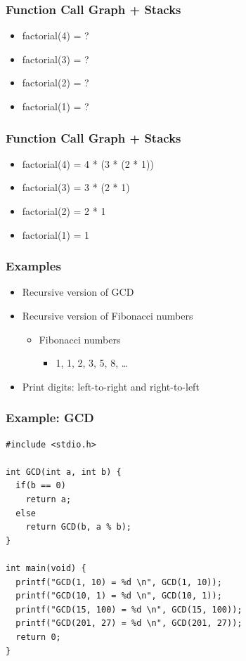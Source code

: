 \documentclass{../c-lecture}
\begin{document}
\begin{frame}
  \frametitle{Function Call Graph + Stacks}
  \begin{itemize}
    \item factorial(4) = ?
    \item factorial(3) = ?
    \item factorial(2) = ?
    \item factorial(1) = ?
  \end{itemize}
\end{frame}

\begin{frame}
  \frametitle{Function Call Graph + Stacks}
  \begin{itemize}
    \item factorial(4) = 4 * (3 * (2 * 1))
    \item factorial(3) = 3 * (2 * 1)
    \item factorial(2) = 2 * 1
    \item factorial(1) = 1
  \end{itemize}
\end{frame}

\begin{frame}
  \frametitle{Examples}
  \begin{itemize}
    \item Recursive version of GCD
    \item Recursive version of Fibonacci numbers
    \begin{itemize}
      \item Fibonacci numbers
      \begin{itemize}
        \item 1, 1, 2, 3, 5, 8, \ldots
      \end{itemize}
    \end{itemize}
    \item Print digits: left-to-right and right-to-left
  \end{itemize}
\end{frame}

\begin{frame}[fragile]
  \frametitle{Example: GCD}
  \scriptsize
  \begin{verbatim}
#include <stdio.h>

int GCD(int a, int b) {
  if(b == 0)
    return a;
  else
    return GCD(b, a % b);
}

int main(void) {
  printf("GCD(1, 10) = %d \n", GCD(1, 10));
  printf("GCD(10, 1) = %d \n", GCD(10, 1));
  printf("GCD(15, 100) = %d \n", GCD(15, 100));
  printf("GCD(201, 27) = %d \n", GCD(201, 27));
  return 0;
}
  \end{verbatim}
\end{frame}
\end{document}
